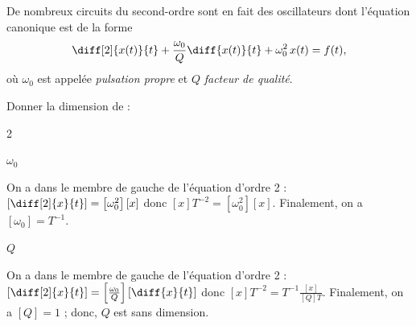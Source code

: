 \hauteurLargeurCadreReponse		{8mm}{3cm}
\initialisationEntrainement


De nombreux circuits du second-ordre sont en fait des oscillateurs dont l'équation canonique est de la forme 
\[
\diff[2]{x(t)}{t} + \frac{\omega_0}{Q} \diff{x(t)}{t} + \omega_0^2\, x(t) =f(t),
\]
où \(\omega_0\) est appelée \emph{pulsation propre} et $Q$ \emph{facteur de qualité}.

\debutEntrainement

Donner la dimension de :

\begin{multicols}{2}


\begin{enonce}
$\omega_0$
\end{enonce}


\begin{corrige}
On a dans le membre de gauche de l'équation d'ordre 2 : $\left[\diff[2]{x}{t}\right] = \left[ \omega_0^2 \right] \left[ x\right] $ donc $[x] T^{-2} = \left[ \omega_0^2 \right] [x]$. Finalement, on a $[\omega_0] = T^{-1}$.
\end{corrige}




\begin{enonce}
$Q$
\end{enonce}


\begin{corrige}
On a dans le membre de gauche de l'équation d'ordre 2 : $\left[\diff[2]{x}{t}\right] = \left[\frac{ \omega_0}{Q}\right] \left[ \diff{x}{t} \right] $ donc $[x]T^{-2} = T^{-1} \frac{[x]}{\left[Q\right]T}$. Finalement, on a $[Q] = 1$ ; donc,  $Q$ est sans dimension.
\end{corrige}


\end{multicols}



